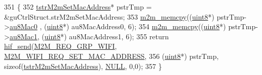\begin{DoxyCode}
351 \{
352     \hyperlink{structtstrM2mSetMacAddress}{tstrM2mSetMacAddress}* pstrTmp = &guCtrlStruct.strM2mSetMacAddress;
353     \hyperlink{nm__common_8h_a62b30b611dfcc58e190254d1f663470a}{m2m\_memcpy}((\hyperlink{group__DataT_ga4df709a77647e870bbf1d955b8edc9a6}{uint8}*) pstrTmp->\hyperlink{structtstrM2mSetMacAddress_acfbc3a49676b607a38ac12c3e16af4ad}{au8Mac0} , (\hyperlink{group__DataT_ga4df709a77647e870bbf1d955b8edc9a6}{uint8}*) au8MacAddress0, 6);
354     \hyperlink{nm__common_8h_a62b30b611dfcc58e190254d1f663470a}{m2m\_memcpy}((\hyperlink{group__DataT_ga4df709a77647e870bbf1d955b8edc9a6}{uint8}*) pstrTmp->\hyperlink{structtstrM2mSetMacAddress_a3f409e492cbbee5518c4f80608776ec6}{au8Mac1}, (\hyperlink{group__DataT_ga4df709a77647e870bbf1d955b8edc9a6}{uint8}*) au8MacAddress1, 6);
355     \textcolor{keywordflow}{return} \hyperlink{m2m__hif_8c_a13ba8ad11b2ac39516ca787386d16ce0}{hif\_send}(\hyperlink{nm__common_8h_a9ab02eb1aea02a75c3f5aade4eef1276aeb9a7d57324ba4b8a6c2a5f46dd499c2}{M2M\_REQ\_GRP\_WIFI}, 
      \hyperlink{group__WlanEnums_gga57466b36df595c593e7ccc9892e14b20a4c2ce5f4fc68f7958e12632e45587b31}{M2M\_WIFI\_REQ\_SET\_MAC\_ADDRESS},
356         (\hyperlink{group__DataT_ga4df709a77647e870bbf1d955b8edc9a6}{uint8}*) pstrTmp, \textcolor{keyword}{sizeof}(\hyperlink{structtstrM2mSetMacAddress}{tstrM2mSetMacAddress}), 
      \hyperlink{group__BSPDefine_ga070d2ce7b6bb7e5c05602aa8c308d0c4}{NULL}, 0,0);
357 \}
\end{DoxyCode}
